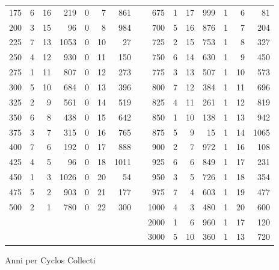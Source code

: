 \begin{tabnums}
\begin{tabular}[c]{@{} r rrr rrr c r rrr rrr @{}}
 175 & 6 & 16 &  219 & 0 &  7 &  861 &&  675 & 1 & 17 &  999 & 1 &  6 &   81 \\
 200 & 3 & 15 &   96 & 0 &  8 &  984 &&  700 & 5 & 16 &  876 & 1 &  7 &  204 \\
 225 & 7 & 13 & 1053 & 0 & 10 &   27 &&  725 & 2 & 15 &  753 & 1 &  8 &  327 \\
 250 & 4 & 12 &  930 & 0 & 11 &  150 &&  750 & 6 & 14 &  630 & 1 &  9 &  450 \\
 275 & 1 & 11 &  807 & 0 & 12 &  273 &&  775 & 3 & 13 &  507 & 1 & 10 &  573 \\
 300 & 5 & 10 &  684 & 0 & 13 &  396 &&  800 & 7 & 12 &  384 & 1 & 11 &  696 \\
 325 & 2 &  9 &  561 & 0 & 14 &  519 &&  825 & 4 & 11 &  261 & 1 & 12 &  819 \\
 350 & 6 &  8 &  438 & 0 & 15 &  642 &&  850 & 1 & 10 &  138 & 1 & 13 &  942 \\
 375 & 3 &  7 &  315 & 0 & 16 &  765 &&  875 & 5 &  9 &   15 & 1 & 14 & 1065 \\
 400 & 7 &  6 &  192 & 0 & 17 &  888 &&  900 & 2 &  7 &  972 & 1 & 16 &  108 \\
 425 & 4 &  5 &   96 & 0 & 18 & 1011 &&  925 & 6 &  6 &  849 & 1 & 17 &  231 \\
 450 & 1 &  3 & 1026 & 0 & 20 &   54 &&  950 & 3 &  5 &  726 & 1 & 18 &  354 \\
 475 & 5 &  2 &  903 & 0 & 21 &  177 &&  975 & 7 &  4 &  603 & 1 & 19 &  477 \\
 500 & 2 &  1 &  780 & 0 & 22 &  300 && 1000 & 4 &  3 &  480 & 1 & 20 &  600 \\
     &   &    &      &   &    &      && 2000 & 1 &  6 &  960 & 1 & 17 &  120 \\
     &   &    &      &   &    &      && 3000 & 5 & 10 &  360 & 1 & 13 &  720 \\
\bottomrule
\end{tabular}
\caption{Anni per Cyclos Collecti}
\label{tab:p203a}
\end{tabnums}
